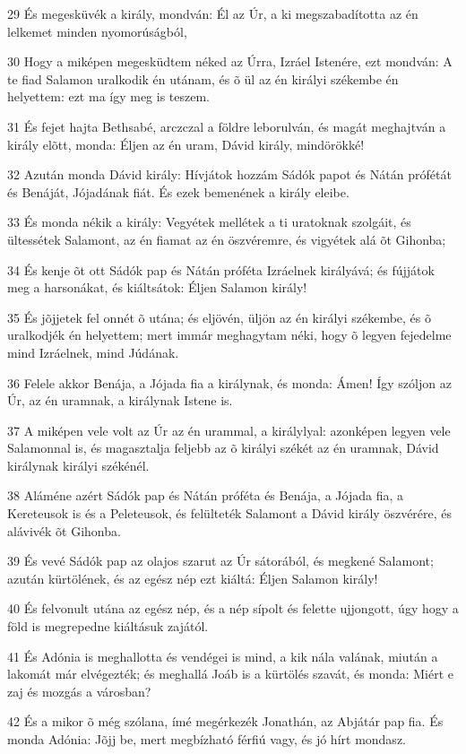 \par 29 És megesküvék a király, mondván: Él az Úr, a ki megszabadította az én lelkemet minden nyomorúságból,
\par 30 Hogy a miképen megesküdtem néked az Úrra, Izráel Istenére, ezt mondván: A te fiad Salamon uralkodik én utánam, és õ ül az én királyi székembe én helyettem: ezt ma így meg is teszem.
\par 31 És fejet hajta Bethsabé, arczczal a földre leborulván, és magát meghajtván a király elõtt, monda: Éljen az én uram, Dávid király, mindörökké!
\par 32 Azután monda Dávid király: Hívjátok hozzám Sádók papot és Nátán prófétát és Benáját,  Jójadának fiát. És ezek bemenének a király eleibe.
\par 33 És monda nékik a király: Vegyétek mellétek a ti uratoknak szolgáit, és ültessétek Salamont, az én fiamat az én öszvéremre, és vigyétek alá õt Gihonba;
\par 34 És kenje õt ott Sádók pap és Nátán próféta Izráelnek királyává; és fújjátok meg a harsonákat, és kiáltsátok: Éljen Salamon király!
\par 35 És jõjjetek fel onnét õ utána; és eljövén, üljön az én királyi székembe, és õ uralkodjék én helyettem; mert immár meghagytam néki, hogy õ legyen fejedelme mind Izráelnek, mind Júdának.
\par 36 Felele akkor Benája, a Jójada fia a királynak, és monda: Ámen! Így szóljon az Úr, az én uramnak, a királynak Istene is.
\par 37 A miképen vele volt az Úr az én urammal, a királylyal: azonképen legyen vele Salamonnal is, és magasztalja feljebb az õ királyi székét az én uramnak, Dávid királynak királyi székénél.
\par 38 Aláméne azért Sádók pap és Nátán próféta és Benája, a Jójada fia, a Kereteusok is és a Peleteusok, és felülteték Salamont a Dávid király öszvérére, és alávivék õt Gihonba.
\par 39 És vevé Sádók pap az olajos szarut az Úr sátorából, és megkené Salamont;  azután kürtölének, és az egész nép ezt kiáltá: Éljen Salamon király!
\par 40 És felvonult utána az egész nép, és a nép sípolt és felette ujjongott, úgy hogy a föld is megrepedne kiáltásuk zajától.
\par 41 És Adónia is meghallotta és vendégei is mind, a kik nála valának, miután a lakomát már elvégezték; és meghallá Joáb is a kürtölés szavát, és monda: Miért e zaj és mozgás a városban?
\par 42 És a mikor õ még szólana, ímé megérkezék Jonathán, az Abjátár pap fia. És monda Adónia: Jõjj be, mert megbízható férfiú vagy, és jó hírt mondasz.
